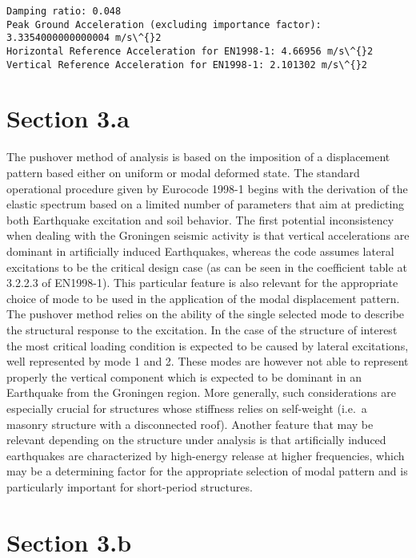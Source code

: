 \documentclass[11pt]{article}
\begin{document}
    \begin{Verbatim}[commandchars=\\\{\}]
Damping ratio: 0.048
Peak Ground Acceleration (excluding importance factor): 3.3354000000000004 m/s\^{}2
Horizontal Reference Acceleration for EN1998-1: 4.66956 m/s\^{}2
Vertical Reference Acceleration for EN1998-1: 2.101302 m/s\^{}2
    \end{Verbatim}

    \section{Section 3.a}\label{section-3.a}

The pushover method of analysis is based on the imposition of a
displacement pattern based either on uniform or modal deformed state.
The standard operational procedure given by Eurocode 1998-1 begins with
the derivation of the elastic spectrum based on a limited number of
parameters that aim at predicting both Earthquake excitation and soil
behavior. The first potential inconsistency when dealing with the
Groningen seismic activity is that vertical accelerations are dominant
in artificially induced Earthquakes, whereas the code assumes lateral
excitations to be the critical design case (as can be seen in the
coefficient table at 3.2.2.3 of EN1998-1). This particular feature is
also relevant for the appropriate choice of mode to be used in the
application of the modal displacement pattern. The pushover method
relies on the ability of the single selected mode to describe the
structural response to the excitation. In the case of the structure of
interest the most critical loading condition is expected to be caused by
lateral excitations, well represented by mode 1 and 2. These modes are
however not able to represent properly the vertical component which is
expected to be dominant in an Earthquake from the Groningen region. More
generally, such considerations are especially crucial for structures
whose stiffness relies on self-weight (i.e.~a masonry structure with a
disconnected roof). Another feature that may be relevant depending on
the structure under analysis is that artificially induced earthquakes
are characterized by high-energy release at higher frequencies, which
may be a determining factor for the appropriate selection of modal
pattern and is particularly important for short-period structures.

    \section{Section 3.b}\label{section-3.b}
\end{document}
